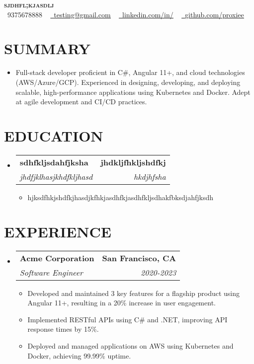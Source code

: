 \documentclass[letterpaper,11pt]{article}
\makeatletter
\newcommand{\resumeItem}[1]{\item\small{{#1 \vspace{-3pt}}}}
\newcommand{\resumeSubheading}[4]{\vspace{-2pt}\item\begin{tabular*}{0.97\textwidth}[t]{l@{\extracolsep{\fill}}r}\textbf{#1} & #2 \\\textit{\small#3} & \textit{\small #4} \\\end{tabular*}\vspace{-7pt}}
\newcommand{\resumeSubHeadingListStart}{\begin{itemize}[leftmargin=0.15in, label={}]}
\newcommand{\resumeSubHeadingListEnd}{\end{itemize}}
\newcommand{\resumeItemListStart}{\begin{itemize}}
\newcommand{\resumeItemListEnd}{\end{itemize}\vspace{-5pt}}
\makeatother
\begin{document}
\begin{center}
    \textbf{\Huge \scshape {\fontsize{15pt}{20pt}\selectfont sjdhfl;kjasdlj}} \\ \vspace{1pt}
    \small \raisebox{-0.1\height}\faPhone\ 9375678888 ~ \href{mailto:testing@gmail.com}{\raisebox{-0.2\height}\faEnvelope\  \underline{testing@gmail.com}} ~ 
    \href{https://www.linkedin.com/feed/}{\raisebox{-0.2\height}\faLinkedin\ \underline{linkedin.com/in/}} ~ 
    \href{https://github.com/proxiee}{\raisebox{-0.2\height}\faGithub\ \underline{github.com/proxiee}}
    \vspace{-8pt}
\end{center}


\section{{\fontsize{9pt}{20pt}\selectfont \textbf{SUMMARY}}}
\resumeSubHeadingListStart

\resumeItem{Full-stack developer proficient in C\#, Angular 11+, and cloud technologies (AWS/Azure/GCP).  Experienced in designing, developing, and deploying scalable, high-performance applications using Kubernetes and Docker.  Adept at agile development and CI/CD practices.}
\resumeSubHeadingListEnd
\vspace{-18pt}

\section{{\fontsize{9pt}{20pt}\selectfont \textbf{EDUCATION}}}
\resumeSubHeadingListStart
\resumeSubheading{sdhfkljsdahfjksha}{\textbf{jhdkljfhkljshdfkj}}{jhdfjklhasjkhdfkljhasd}{hkdjhfsha}
\resumeItemListStart
\resumeItem{hjksdfhkjshdfkjhasdjkfhkjasdhfkjasdhfkljsdhakfbksdjahfjksdh}
\resumeItemListEnd
\resumeSubHeadingListEnd
\vspace{-18pt}

\section{{\fontsize{9pt}{20pt}\selectfont \textbf{EXPERIENCE}}}
\resumeSubHeadingListStart
\resumeSubheading{Acme Corporation}{\textbf{San Francisco, CA}}{Software Engineer}{2020-2023}
\resumeItemListStart
\resumeItem{Developed and maintained 3 key features for a flagship product using Angular 11+, resulting in a 20\% increase in user engagement.}
\resumeItem{Implemented RESTful APIs using C\# and .NET, improving API response times by 15\%.}
\resumeItem{Deployed and managed applications on AWS using Kubernetes and Docker, achieving 99.99\% uptime.}
\resumeItemListEnd
\resumeSubHeadingListEnd
\vspace{-17pt}
\end{document}
